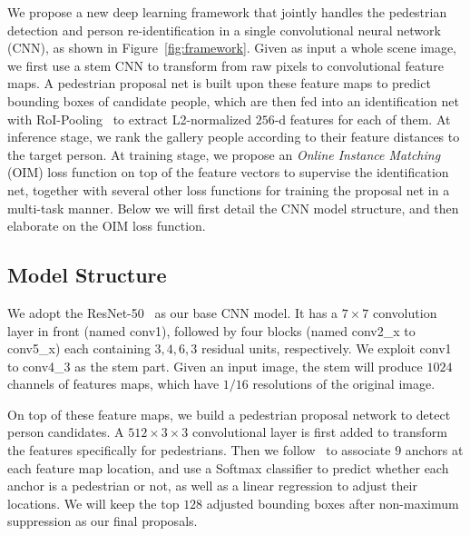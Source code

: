 We propose a new deep learning framework that jointly handles the pedestrian detection and person re-identification in a single convolutional neural network (CNN), as shown in Figure~\ref{fig:framework}. Given as input a whole scene image, we first use a stem CNN to transform from raw pixels to convolutional feature maps. A pedestrian proposal net is built upon these feature maps to predict bounding boxes of candidate people, which are then fed into an identification net with RoI-Pooling~\cite{girshick2015fast} to extract L2-normalized $256$-d features for each of them. At inference stage, we rank the gallery people according to their feature distances to the target person. At training stage, we propose an \textit{Online Instance Matching} (OIM) loss function on top of the feature vectors to supervise the identification net, together with several other loss functions for training the proposal net in a multi-task manner. Below we will first detail the CNN model structure, and then elaborate on the OIM loss function.

\subsection{Model Structure} %
\label{sub:model_structure}
We adopt the ResNet-50~\cite{he2015deep} as our base CNN model. It has a $7\times 7$ convolution layer in front (named conv1), followed by four blocks (named conv2\_x to conv5\_x) each containing $3, 4, 6, 3$ residual units, respectively. We exploit conv1 to conv4\_3 as the stem part. Given an input image, the stem will produce $1024$ channels of features maps, which have $1/16$ resolutions of the original image.

On top of these feature maps, we build a pedestrian proposal network to detect person candidates. A $512\times3\times3$ convolutional layer is first added to transform the features specifically for pedestrians. Then we follow~\cite{ren2015faster} to associate $9$ anchors at each feature map location, and use a Softmax classifier to predict whether each anchor is a pedestrian or not, as well as a linear regression to adjust their locations. We will keep the top $128$ adjusted bounding boxes after non-maximum suppression as our final proposals.

